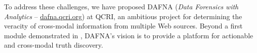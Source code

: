 \documentclass[prodmode,acmtecs]{acmsmall} %
\begin{document}
To address these challenges, we have proposed DAFNA (\emph{Data Forensics with Analytics} -- {\url{dafna.qcri.org}}) 
at QCRI, an ambitious project for determining the veracity of  cross-modal information from multiple Web sources. Beyond 
a first module demonstrated in \cite{Wagui15}, DAFNA's vision is to provide a platform for actionable and cross-modal truth
discovery.
 
 
 




\end{document}
